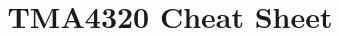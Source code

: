 \documentclass[6pt]{article}
\date{}
\title{TMA4320 Cheat Sheet}
\theoremstyle{definition}
\begin{document}
\begin{multicols*}{3}

\maketitle







\end{multicols*}
\end{document}

